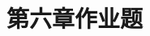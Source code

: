 \documentclass{article}
\begin{document}
\title{第六章作业题}
\begin{CJK}{UTF8}{gbsn}
  \newtheorem{Exercise}{习题}
  \date{}
  \maketitle

  
%  
  
%  
  
%  
  
%  
  
%  
  
%  
  
%  
%  
%  
  
%  
  
%  
  
%  
  
%  
  
%  
  
%  
  
%  

\end{CJK}
\end{document}
